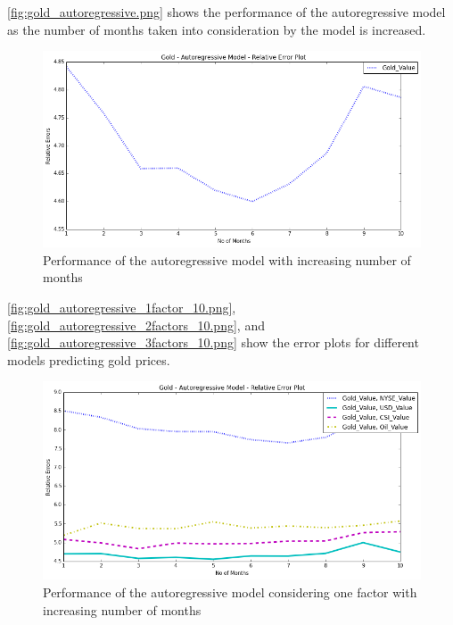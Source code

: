 \documentclass[runningheads]{llncs}
\begin{document}
\noindent \autoref{fig:gold_autoregressive.png} shows the performance of the autoregressive model as the number of months taken into consideration by the model is increased. \\

\begin{figure}
\centering
\includegraphics[width=\textwidth]{gold_autoregressive.png}
\caption{Performance of the autoregressive model with increasing number of months}
\label{fig:gold_autoregressive.png}
\end{figure}

\noindent \autoref{fig:gold_autoregressive_1factor_10.png}, \autoref{fig:gold_autoregressive_2factors_10.png}, and \autoref{fig:gold_autoregressive_3factors_10.png} show the error plots for different models predicting gold prices. 

\begin{figure}
\centering
\includegraphics[width=\textwidth]{gold_autoregressive_1factor_10.png}
\caption{Performance of the autoregressive model considering one factor with increasing number of months}
\label{fig:gold_autoregressive_1factor_10.png}
\end{figure}
\end{document}
